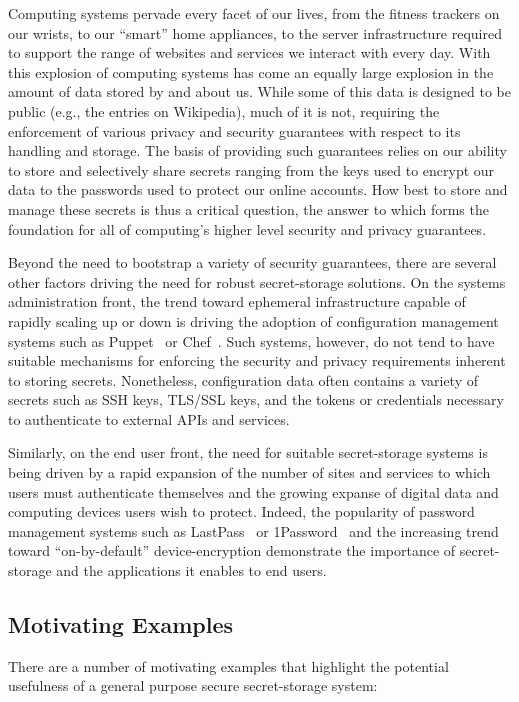 Computing systems pervade every facet of our lives, from the fitness
trackers on our wrists, to our ``smart'' home appliances, to the
server infrastructure required to support the range of websites and
services we interact with every day. With this explosion of computing
systems has come an equally large explosion in the amount of data
stored by and about us. While some of this data is designed to be
public (e.g., the entries on Wikipedia), much of it is not, requiring
the enforcement of various privacy and security guarantees with
respect to its handling and storage. The basis of providing such
guarantees relies on our ability to store and selectively share
secrets ranging from the keys used to encrypt our data to the
passwords used to protect our online accounts. How best to store and
manage these secrets is thus a critical question, the answer to which
forms the foundation for all of computing's higher level security and
privacy guarantees.

Beyond the need to bootstrap a variety of security guarantees, there
are several other factors driving the need for robust secret-storage
solutions. On the systems administration front, the trend toward
ephemeral infrastructure capable of rapidly scaling up or down is
driving the adoption of configuration management systems such as
Puppet~\cite{puppet} or Chef~\cite{chef}. Such systems, however, do
not tend to have suitable mechanisms for enforcing the security and
privacy requirements inherent to storing secrets. Nonetheless,
configuration data often contains a variety of secrets such as SSH
keys, TLS/SSL keys, and the tokens or credentials necessary to
authenticate to external APIs and services.

Similarly, on the end user front, the need for suitable secret-storage
systems is being driven by a rapid expansion of the number of sites
and services to which users must authenticate themselves and the
growing expanse of digital data and computing devices users wish to
protect. Indeed, the popularity of password management systems such as
LastPass~\cite{lastpass} or 1Password~\cite{onepassword} and the
increasing trend toward ``on-by-default'' device-encryption
demonstrate the importance of secret-storage and the applications it
enables to end users.

\subsection{Motivating Examples}

There are a number of motivating examples that highlight the potential
usefulness of a general purpose secure secret-storage system:

